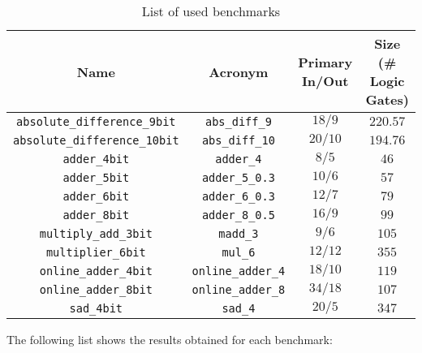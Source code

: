 \documentclass[]{usiinfbachelorproject}
\begin{document}
\begin{table}[H]
\centering
\begin{tabular}{c|c|cc}
\textbf{Name}          & \textbf{Acronym} & \textbf{Primary In/Out}     & \textbf{Size (\# Logic Gates)} \\ \hline
\texttt{absolute\_difference\_9bit} & \texttt{abs\_diff\_9}     & \multicolumn{1}{c|}{$18/9$} & $220.57$                       \\\hline
\texttt{absolute\_difference\_10bit} & \texttt{abs\_diff\_10}    & \multicolumn{1}{c|}{$20/10$}  & $194.76$                       \\\hline
\texttt{adder\_4bit}               & \texttt{adder\_4}         & \multicolumn{1}{c|}{$8/5$}    & $46$                           \\\hline
\texttt{adder\_5bit}          & \texttt{adder\_5\_0.3}    & \multicolumn{1}{c|}{$10/6$}   & $57$                           \\\hline
\texttt{adder\_6bit}          & \texttt{adder\_6\_0.3}    & \multicolumn{1}{c|}{$12/7$}   & $79$                           \\\hline
\texttt{adder\_8bit}          & \texttt{adder\_8\_0.5}    & \multicolumn{1}{c|}{$16/9$}   & $99$                           \\\hline
\texttt{multiply\_add\_3bit}        & \texttt{madd\_3}          & \multicolumn{1}{c|}{$9/6$}    & $105$                          \\\hline
\texttt{multiplier\_6bit}           & \texttt{mul\_6}           & \multicolumn{1}{c|}{$12/12$}  & $355$                          \\\hline
\texttt{online\_adder\_4bit}        & \texttt{online\_adder\_4} & \multicolumn{1}{c|}{$18/10$}  & $119$                          \\\hline
\texttt{online\_adder\_8bit}        & \texttt{online\_adder\_8} & \multicolumn{1}{c|}{$34/18$}  & $107$                          \\\hline
\texttt{sad\_4bit}                  & \texttt{sad\_4}           & \multicolumn{1}{c|}{$20/5$}   & $347$ 
\end{tabular}
\caption{List of used benchmarks}
\label{tab:benchs}
\end{table}
\newpage
The following list shows the results obtained for each benchmark:
\end{document}
